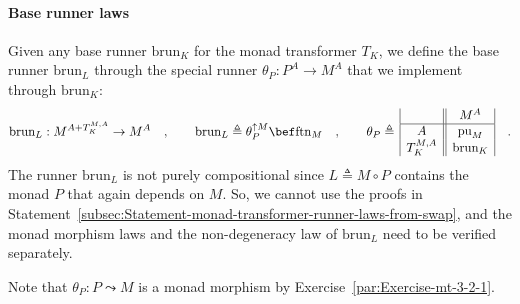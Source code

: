 \paragraph{Base runner laws}

Given any base runner $\text{brun}_{K}$ for the monad transformer
$T_{K}$, we define the base runner $\text{brun}_{L}$ through the
special runner $\theta_{P}:P^{A}\rightarrow M^{A}$ that we implement
through $\text{brun}_{K}$:
\begin{equation}
\text{brun}_{L}:M^{A+T_{K}^{M,A}}\rightarrow M^{A}\quad,\quad\quad\text{brun}_{L}\triangleq\theta_{P}^{\uparrow M}\bef\text{ftn}_{M}\quad,\quad\quad\theta_{P}\triangleq\,\begin{array}{|c||c|}
 & M^{A}\\
\hline A & \text{pu}_{M}\\
T_{K}^{M,A} & \text{brun}_{K}
\end{array}\quad.\label{eq:def-of-brun-and-theta-for-free-pointed}
\end{equation}
The runner $\text{brun}_{L}$ is not purely compositional since $L\triangleq M\circ P$
contains the monad $P$ that again depends on $M$. So, we cannot
use the proofs in Statement~\ref{subsec:Statement-monad-transformer-runner-laws-from-swap},
and the monad morphism laws and the non-degeneracy law of $\text{brun}_{L}$
need to be verified separately.

Note that $\theta_{P}:P\leadsto M$ is a monad morphism by Exercise~\ref{par:Exercise-mt-3-2-1}.


